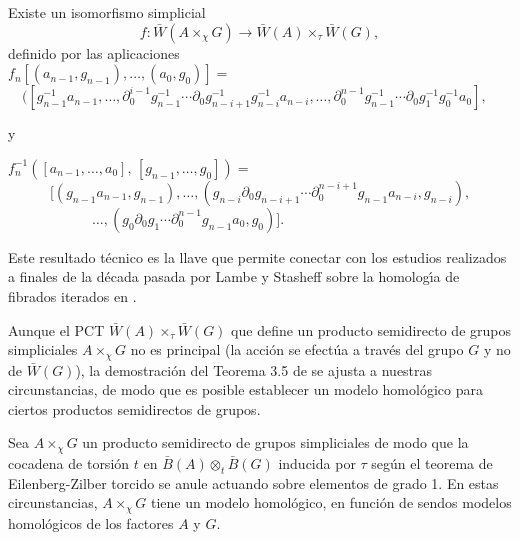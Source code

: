 \begin{thr}\label{tic}
Existe un isomorfismo simplicial $$f:\bar{W}(A\times_\chi
G)\longrightarrow \bar{W}(A)\times_\tau\bar{W}(G),$$
definido por las aplicaciones\\

\noindent $f_n[(a_{n-1},g_{n-1}),\ldots,(a_0,g_0)]  = $\\ $\quad
([g^{-1}_{n-1} a_{n-1},\ldots,
\partial^{i-1}_0g^{-1}_{n-1}\cdots \partial_0g^{-1}_{n-i+1}
g^{-1}_{n-i} a_{n-i},\ldots,
 \partial^{n-1}_0g^{-1}_{n-1}\cdots \partial_0g^{-1}_1
g^{-1}_0a_0],$\\ \hspace*{8cm}{$\qquad \qquad \qquad
[g_{n-1},\ldots,g_0]);$}

\vspace*{.25cm}
\noindent y

\vspace*{.25cm}
\noindent
$f^{-1}_n([a_{n-1},\ldots,a_0],\,[g_{n-1},\ldots,g_0]) = $\\
$\qquad \quad [(g_{n-1}a_{n-1},g_{n-1}),\ldots,
(g_{n-i}\partial_0g_{n-i+1}\cdots\partial_0^{n-i+1}g_{n-1}a_{n-i},
g_{n-i}),$\\ \hspace*{5cm}$\qquad \qquad \qquad \ldots, (g_0\partial_0g_1\cdots
\partial_0^{n-1}g_{n-1} a_0, g_0)].$
\end{thr}

Este resultado t\'{e}cnico es la llave que permite conectar con los
estudios realizados a finales de la d\'{e}cada pasada por Lambe y
Stasheff sobre la homolog\'{\i}a de fibrados iterados en
\cite{LS87}.

Aunque el PCT $\bar{W}(A)\times_\tau\bar{W}(G)$ que define un
producto semidirecto de grupos simpliciales $A \times _\chi G$ no
es principal (la acci\'{o}n se efect\'{u}a a trav\'{e}s del grupo $G$ y
no de $\bar{W}(G)$), la demostraci\'{o}n del Teorema 3.5 de
\cite{LS87} se ajusta a nuestras circunstancias, de modo que es
posible establecer un modelo homol\'{o}gico para ciertos productos
semidirectos de grupos.

\begin{thr} Sea $A \times _\chi G$ un producto semidirecto de grupos
simpliciales de modo que la cocadena de torsi\'{o}n $t$ en
$\bar{B}(A)\otimes_t \bar{B}(G)$ inducida por $\tau$ seg\'{u}n el
teorema de Eilenberg-Zilber torcido se anule actuando sobre
elementos de grado 1. En estas circunstancias, $A \times _\chi G$
tiene un modelo homol\'{o}gico, en funci\'{o}n de sendos modelos
homol\'{o}gicos de los factores $A$ y $G$.
\end{thr}

